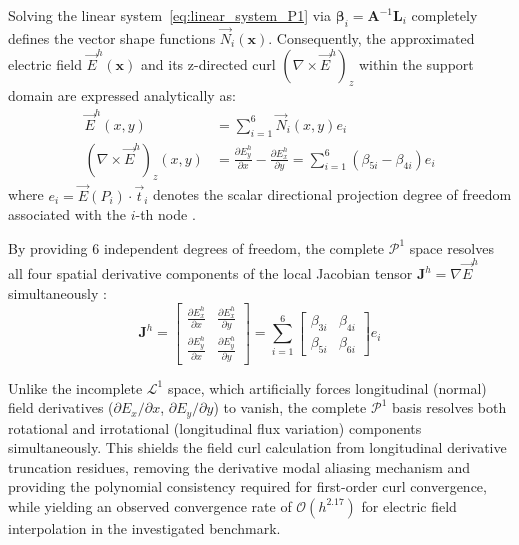 \documentclass[preprint,12pt]{elsarticle}
\begin{document}
Solving the linear system~\eqref{eq:linear_system_P1} via $\boldsymbol{\beta}_i = \mathbf{A}^{-1} \mathbf{L}_i$ completely defines the vector shape functions $\vec{N}_i(\mathbf{x})$. Consequently, the approximated electric field $\vec{E}^h(\mathbf{x})$ and its z-directed curl $(\nabla \times \vec{E}^h)_z$ within the support domain are expressed analytically as:
\begin{align}
\vec{E}^h(x, y) &= \sum_{i=1}^6 \vec{N}_i(x, y) e_i \label{eq:field_approximation_P1} \\[4pt]
(\nabla \times \vec{E}^h)_z(x, y) &= \frac{\partial E_y^h}{\partial x} - \frac{\partial E_x^h}{\partial y} = \sum_{i=1}^6 (\beta_{5i} - \beta_{4i}) e_i \label{eq:curl_approximation_P1}
\end{align}
where $e_i = \vec{E}(P_i) \cdot \vec{t}_i$ denotes the scalar directional projection degree of freedom associated with the $i$-th node \cite{ortiz2021nodal, goncalves2025tese}.

By providing 6 independent degrees of freedom, the complete $\mathcal{P}^1$ space resolves all four spatial derivative components of the local Jacobian tensor $\mathbf{J}^h = \nabla \vec{E}^h$ simultaneously \cite{nedelec1986new, goncalves2025tese}:
\begin{equation}
\mathbf{J}^h = \begin{bmatrix} 
\frac{\partial E_x^h}{\partial x} & \frac{\partial E_x^h}{\partial y} \\[4pt]
\frac{\partial E_y^h}{\partial x} & \frac{\partial E_y^h}{\partial y} 
\end{bmatrix} = \sum_{i=1}^6 \begin{bmatrix} 
\beta_{3i} & \beta_{4i} \\[4pt]
\beta_{5i} & \beta_{6i}
\end{bmatrix} e_i
\label{eq:full_jacobian_tensor_P1}
\end{equation}

Unlike the incomplete $\mathcal{L}^1$ space, which artificially forces longitudinal (normal) field derivatives ($\partial E_x/\partial x$, $\partial E_y/\partial y$) to vanish, the complete $\mathcal{P}^1$ basis resolves both rotational and irrotational (longitudinal flux variation) components simultaneously. This shields the field curl calculation from longitudinal derivative truncation residues, removing the derivative modal aliasing mechanism and providing the polynomial consistency required for first-order curl convergence, while yielding an observed convergence rate of $\mathcal{O}(h^{2.17})$ for electric field interpolation in the investigated benchmark.
\end{document}
